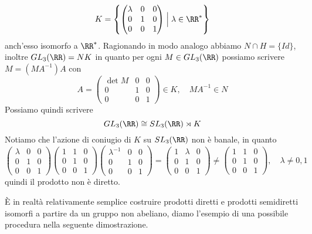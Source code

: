 \documentclass[11pt]{scrartcl}
\begin{document}
\[
    K = \left\{\begin{pmatrix}
        \lambda & 0 & 0\\
        0 & 1 & 0\\
        0 & 0 & 1
    \end{pmatrix}\Bigm| \lambda \in \RR^* \right\}
\]
anch'esso isomorfo a $\RR^*$. Ragionando in modo analogo abbiamo $N \cap H = \{Id\}$, 
inoltre $GL_3(\RR) = NK$ in quanto per ogni $M \in GL_3(\RR)$ possiamo scrivere
$M = (MA^{-1})A$ con 
\[
    A = \begin{pmatrix}
        \det M & 0 & 0\\
        0 & 1 & 0\\
        0 & 0 & 1
    \end{pmatrix} \in K, \quad MA^{-1} \in N
\]
Possiamo quindi scrivere 
\[
    GL_3(\RR) \cong SL_3(\RR)\rtimes K
\]
Notiamo che l'azione di coniugio di $K$ su $SL_3(\RR)$ non è banale, in 
quanto
\[
    \begin{pmatrix}
        \lambda & 0 & 0\\
        0 & 1 & 0\\
        0 & 0 & 1
    \end{pmatrix}
    \begin{pmatrix}
        1 & 1 & 0\\
        0 & 1 & 0\\
        0 & 0 & 1
    \end{pmatrix}
    \begin{pmatrix}
        \lambda^{-1}& 0 & 0\\
        0 & 1 & 0\\
        0 & 0 & 1
    \end{pmatrix} = 
    \begin{pmatrix}
        1 & \lambda & 0\\
        0 & 1 & 0\\
        0 & 0 & 1
    \end{pmatrix} \neq \begin{pmatrix}
        1 & 1 & 0\\
        0 & 1 & 0\\
        0 & 0 & 1
    \end{pmatrix},\quad \lambda \neq 0, 1
\]
quindi il prodotto non è diretto.\newline


È in realtà relativamente semplice costruire prodotti diretti e prodotti semidiretti
isomorfi a partire da un gruppo non abeliano, diamo l'esempio di una possibile
procedura nella seguente dimostrazione.
\end{document}
